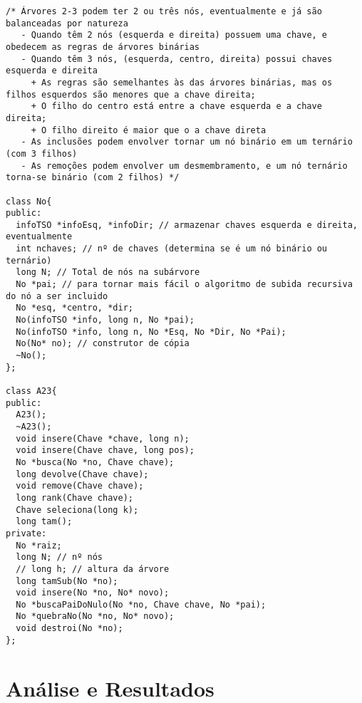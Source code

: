 \documentclass[a4paper]{article}
\begin{document}
\begin{verbatim}
/* Árvores 2-3 podem ter 2 ou três nós, eventualmente e já são balanceadas por natureza
   - Quando têm 2 nós (esquerda e direita) possuem uma chave, e obedecem as regras de árvores binárias
   - Quando têm 3 nós, (esquerda, centro, direita) possui chaves esquerda e direita
     + As regras são semelhantes às das árvores binárias, mas os filhos esquerdos são menores que a chave direita;
     + O filho do centro está entre a chave esquerda e a chave direita;
     + O filho direito é maior que o a chave direta
   - As inclusões podem envolver tornar um nó binário em um ternário (com 3 filhos)
   - As remoções podem envolver um desmembramento, e um nó ternário torna-se binário (com 2 filhos) */

class No{
public:
  infoTSO *infoEsq, *infoDir; // armazenar chaves esquerda e direita, eventualmente
  int nchaves; // nº de chaves (determina se é um nó binário ou ternário)
  long N; // Total de nós na subárvore
  No *pai; // para tornar mais fácil o algoritmo de subida recursiva do nó a ser incluido
  No *esq, *centro, *dir;
  No(infoTSO *info, long n, No *pai);
  No(infoTSO *info, long n, No *Esq, No *Dir, No *Pai);
  No(No* no); // construtor de cópia
  ~No();
};

class A23{
public:
  A23();
  ~A23();
  void insere(Chave *chave, long n);
  void insere(Chave chave, long pos);
  No *busca(No *no, Chave chave);
  long devolve(Chave chave);
  void remove(Chave chave);
  long rank(Chave chave);
  Chave seleciona(long k);
  long tam();
private:
  No *raiz;
  long N; // nº nós
  // long h; // altura da árvore
  long tamSub(No *no);
  void insere(No *no, No* novo);
  No *buscaPaiDoNulo(No *no, Chave chave, No *pai);
  No *quebraNo(No *no, No* novo);
  void destroi(No *no);
};
\end{verbatim}

\section{Análise e Resultados}
\label{sec:analise-e-resultados}
\newpage
\end{document}
